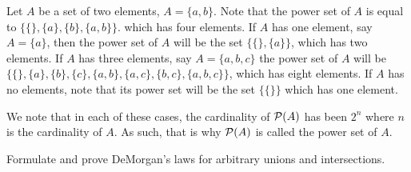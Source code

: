 \documentclass[12pt]{article}
\begin{document}
Let $A$ be a set of two elements, $A = \{a, b\}$. Note that the power set of $A$
is equal to $\{\{\}, \{a\}, \{b\}, \{a, b\}\}$. which has four elements. If 
$A$ has one element, say $A = \{a\}$, then the power set of $A$ will be the set 
$\{\{\}, \{a\}\}$, which has two elements. If $A$ has three elements, say 
$A = \{a, b, c\}$ the power set of $A$ will be 
$\{\{\}, \{a\}, \{b\}, \{c\}, \{a, b\}, \{a, c\}, \{b, c\}, \{a, b, c\}\}$, which 
has eight elements. If $A$ has no elements, note that its power set will be the set 
$\{\{\}\}$ which has one element.

We note that in each of these cases, the cardinality of $\mathcal{P}(A)$ has been
$2^n$ where $n$ is the cardinality of $A$. As such, that is why $\mathcal{P}(A)$
is called the power set of $A$.

 Formulate and prove DeMorgan's laws for arbitrary unions and intersections.
\end{document}
